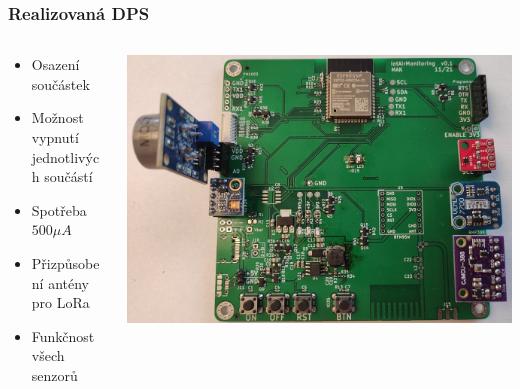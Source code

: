 \documentclass[%
  12pt,       				%
	t,                  %
	aspectratio=1610,   %
	unicode,						%
]{beamer}				    	%
\begin{document}
\begin{frame}
	\frametitle{Realizovaná DPS}
	\begin{columns}[T]
		\begin{column}{0.4\columnwidth}
			\vspace{0.5cm}
			\begin{itemize}
				\item Osazení součástek
				\item Možnost vypnutí jednotlivých součástí
				\item Spotřeba $500\mu A$
				\item Přizpůsobení antény pro LoRa
				\item Funkčnost všech senzorů
			\end{itemize}
		\end{column}

		\begin{column}{0.6\columnwidth}
			\vspace{0.5cm}
			\centering
			\includegraphics[width=1\columnwidth]{obrazky/pcb-full.jpg}
		\end{column}
	\end{columns}
\end{frame}


\end{document}
